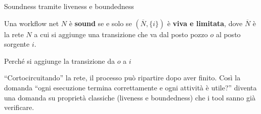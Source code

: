 \begin{boxtheorem}{Soundness tramite liveness e boundedness}

Una workflow net \(N\) è \textbf{sound} se e solo se
\((\overline{N}, \{i\})\) è \textbf{viva e limitata}, dove
\(\overline{N}\) è la rete \(N\) a cui si aggiunge una transizione che
va dal posto pozzo \(o\) al posto sorgente \(i\).

\end{boxtheorem}

\begin{boxtip}{Perché si aggiunge la transizione da \(o\) a \(i\)}

``Cortocircuitando'' la rete, il processo può ripartire dopo aver
finito. Così la domanda ``ogni esecuzione termina correttamente e ogni
attività è utile?'' diventa una domanda su proprietà classiche (liveness
e boundedness) che i tool sanno già verificare.

\end{boxtip}
